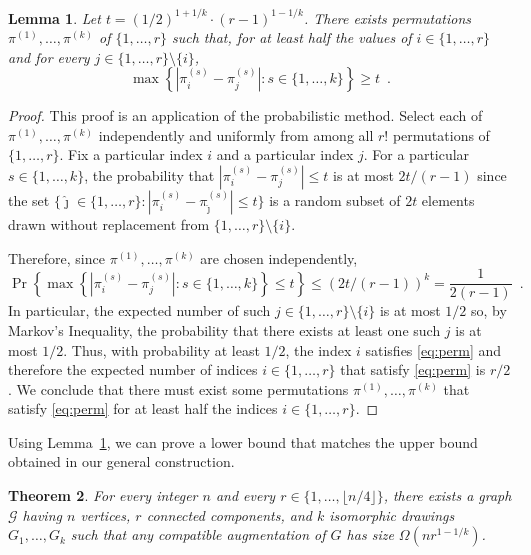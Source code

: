 \documentclass[a4paper, 11pt]{article}
\newtheorem{theorem}{Theorem}[section]
\newtheorem{lemma}[theorem]{Lemma}
\begin{document}
\begin{lemma}\label{lem:permutations}
Let $t=(1/2)^{1+1/k}\cdot(r-1)^{1-1/k}$.  There exists permutations $\pi^{(1)},\ldots,\pi^{(k)}$ of $\{1,\ldots,r\}$ such that, for at least half the values of $i\in\{1,\ldots,r\}$ and for every $j\in\{1,\ldots,r\}\setminus\{i\}$, 
\begin{equation}
 \max\left\{\left|\pi^{(s)}_i-\pi^{(s)}_j\right|\colon s\in\{1,\ldots,k\} \right\}
 \ge t \enspace .
     \label{eq:perm}
\end{equation}
\end{lemma}

\begin{proof}
  This proof is an application of the probabilistic method.  Select each
  of $\pi^{(1)},\ldots,\pi^{(k)}$ independently and uniformly from among
  all $r!$ permutations of $\{1,\ldots,r\}$.  Fix a particular index $i$
  and a particular index $j$.  For a particular $s\in\{1,\ldots,k\}$, the
  probability that $|\pi^{(s)}_i-\pi^{(s)}_j|\le t$ is at most $2t/(r-1)$
  since the set
  $\{\hat \jmath\in\{1,\ldots,r\} \colon |\pi^{(s)}_i-\pi^{(s)}_{\hat
   \jmath}|\le t\}$ is a random subset of $2t$ elements drawn without
  replacement from $\{1,\ldots,r\}\setminus \{i\}$.

  Therefore, since $\pi^{(1)},\ldots,\pi^{(k)}$ are chosen independently, 
  \[
    \Pr\left\{\max\left\{\left|\pi^{(s)}_i-\pi^{(s)}_j\right|\colon s\in\{1,\ldots,k\} \right\}\le t\right\} \le (2t/(r-1))^k = \frac{1}{2(r-1)} \enspace .
  \]
  In particular, the expected number of such
  $j\in\{1,\ldots,r\}\setminus\{i\}$ is at most $1/2$ so, by Markov's
  Inequality, the probability that there exists at least one such $j$
  is at most $1/2$.  Thus, with probability at least $1/2$, the index $i$
  satisfies \eqref{eq:perm} and therefore the expected number of indices $i\in\{1,\ldots,r\}$
  that satisfy \eqref{eq:perm} is $r/2$.  We conclude that there must exist
  some permutations $\pi^{(1)},\ldots,\pi^{(k)}$ that satisfy \eqref{eq:perm}
  for at least half the indices $i\in\{1,\ldots,r\}$.
\end{proof}

Using Lemma~\ref{lem:permutations}, we can prove a lower bound that matches the upper bound obtained in our general construction.

\begin{theorem}\label{thm:lower-bound}
  For every integer $n$ and every $r\in\{1,\ldots,\lfloor n/4\rfloor\}$,
  there exists a graph $\mathcal G$ having $n$ vertices, $r$ connected
  components, and $k$ isomorphic drawings $G_1,\ldots,G_k$ such that
  any compatible augmentation of $G$ has size $\Omega(nr^{1-1/k})$.
\end{theorem}
\end{document}

